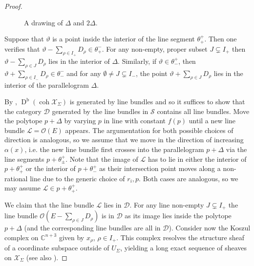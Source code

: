 \documentclass[reqno, 12pt]{amsart}
\theoremstyle{definition}
\numberwithin{equation}{section}
\newcommand{\dbcoh}[1]{\operatorname{D}^{\operatorname{b}}(\operatorname{coh }#1)}
\newcommand{\C}{\mathbb{C}}
\def\O{\mathcal{O}}
\begin{document}
\begin{proof}
\begin{figure}[ht!]
\caption{A drawing of $\Delta$ and $2\Delta$.}
    \label{fig:Parallelo}
\end{figure}

Suppose that $\vartheta$ is a point inside the interior of the line segment $\theta_{+}^+$. Then one verifies that $\vartheta-\sum_{\rho\in I_+}D_\rho\in\theta_+^-$. For any non-empty, proper subset $J\subsetneq I_+$ then $\vartheta-\sum_{\rho\in J}D_\rho$ lies in the interior of $\Delta$. 
Similarly, if $\vartheta\in\theta_-^+$, then $\vartheta+\sum_{\rho\in I_-}D_\rho\in \theta_-^-$ and for any $\emptyset\neq J\subsetneq I_-$, the point $\vartheta+\sum_{\rho\in J}D_\rho$ lies in the interior of the parallelogram $\Delta$. 

By \cite[Corollary 4.8]{BorHor1}, $\dbcoh{\mathcal{X}_\Sigma}$ is generated by line bundles and so it suffices to show that the category $\mathcal{D}$ generated by the line bundles in $\mathcal{S}$ contains all line bundles. Move the polytope $p+\Delta$ by varying $p$ in line with constant $f(p)$ until a new line bundle $\mathcal{L}=\O(E)$ appears. The argumentation for both possible choices of direction is analogous, so we assume that we move in the direction of increasing $\alpha(x)$, i.e. the new line bundle first crosses into the parallelogram $p+\Delta$ via the line segments $p+\theta_\pm^+$.  Note that the image of $\mathcal{L}$ has to lie in either the interior of $p+\theta_+^+$ or the interior of $p+\theta_-^+$ as their intersection point moves along a non-rational line due to the generic choice of $r_i, p$. Both cases are analogous, so we may assume $\mathcal{L}\in p+\theta_+^+$.

We claim that the line bundle $\mathcal{L}$ lies in $\mathcal{D}$. For any line non-empty $J\subsetneq I_+$ the line bundle $\O(E-\sum_{\rho\in J}D_\rho)$ is in $\mathcal{D}$ as its image lies inside the polytope $p+\Delta$ (and the corresponding line bundles are all in $\mathcal{D}$). Consider now the Koszul complex on $\C^{n+3}$ given by $x_\rho$, $\rho\in I_+$. This complex resolves the structure sheaf of a coordinate subspace outside of $U_\Sigma$, yielding a long exact sequence of sheaves on $\mathcal{X}_\Sigma$ (see also \cite{BorHor1}).


\end{proof}
\end{document}

